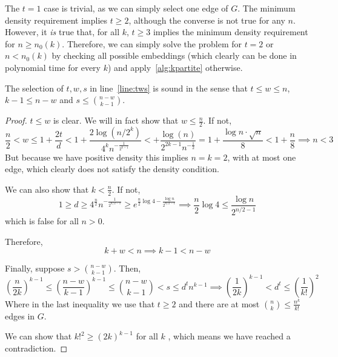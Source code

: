\begin{remark} %
    The $t=1$ case is trivial, as we can simply select one edge of $G$.
    The minimum density requirement implies $t \geq 2$, although the converse is not true for any $n$.
    However, it \emph{is} true that, for all $k$, $t \geq 3$ implies the minimum density requirement
    for $n \geq n_0(k)$.
    Therefore, we can simply solve the problem for $t = 2$ or $n < n_0(k)$
    by checking all possible embeddings (which clearly can be done in polynomial time for every $k$) and apply~\ref{alg:kpartite} otherwise.
\end{remark}

\begin{lemma}
    The selection of $t, w, s$ in line~\ref{line:tws} is sound in the sense that
    $t  \leq w \leq n$, $k - 1 \leq n - w$ and $s \leq \binom{n - w}{k - 1}$.
    \begin{proof}
        $t \leq w$ is clear.
        We will in fact show that $w \leq \frac{n}{2}$.
        If not,
        \[
            \frac{n}{2} <
            w \leq 1 + \frac{2t}{d} <
            1 + \frac{2 \log (n/2^k)}{4^k n^{-\frac{1}{2^{k-1}}}} <
            + \frac{\log(n)}{2^{2k-1} n^{-\frac{1}{2}}} =
            1 + \frac{\log n \cdot \sqrt {n}}{8} <
            1 + \frac{n}{8} \implies n < 3
        \]
        But because we have positive density this implies $n = k = 2$, with at most one edge, which clearly
        does not satisfy the density condition.

        We can also show that $k < \frac{n}{2}$.
        If not,
        \[
            1 \geq
            d \geq
            4^{\frac{n}{2}} n^{-\frac{1}{2^{n/2-1}}} \geq
            e^{\frac{n}{2} \log 4 - \frac{\log n}{2^{n/2-1}}} \implies
            \frac{n}{2} \log 4 \leq \frac{\log n}{2^{n/2-1}}
        \]
        which is false for all $n > 0$. %

        Therefore,
        \[
            k + w < n \implies k - 1 < n - w
        \]

        Finally, suppose $s > \binom{n - w}{k - 1}$.
        Then,
        \[
            \left( \frac{n}{2k} \right)^{k-1} \leq \left( \frac{n-w}{k-1} \right)^{k-1} \leq \binom{n - w}{k - 1} < s \leq d^t n^{k-1}
            \implies  \left( \frac{1}{2k} \right)^{k-1} < d^t \leq \left( \frac{1}{k!} \right)^2
        \]
        Where in the last inequality we use that $t \geq 2$ and there are at most
        $\binom{n}{k} \leq \frac{n^k}{k!}$ edges in $G$.

        We can show that $k!^2 \geq (2k)^{k-1}$ for all $k$ %
        , which means we have reached a contradiction.

    \end{proof}
\end{lemma}


